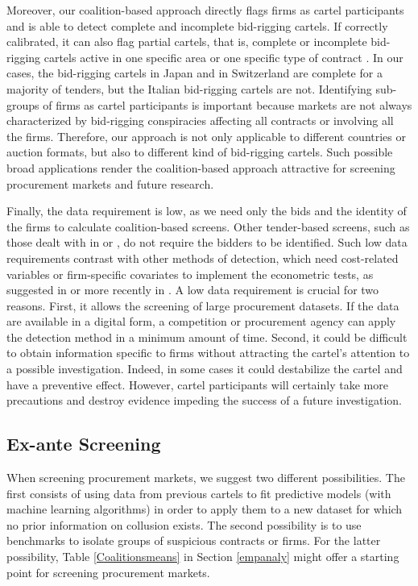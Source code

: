 \documentclass[a4paper,11pt]{article}
\begin{document}
	Moreover, our coalition-based approach directly flags firms as cartel participants and is able to detect complete and incomplete bid-rigging cartels. If correctly calibrated, it can also flag partial cartels, that is, complete or incomplete bid-rigging cartels active in one specific area or one specific type of contract \citep[see, for example,][]{imhof2018screening,Abrantes2006}. In our cases, the bid-rigging cartels in Japan and in Switzerland are complete for a majority of tenders, but the Italian bid-rigging cartels are not. Identifying sub-groups of firms as cartel participants is important because markets are not always characterized by bid-rigging conspiracies affecting all contracts or involving all the firms. Therefore, our approach is not only applicable to different countries or auction formats, but also to different kind of bid-rigging cartels. Such possible broad applications render the coalition-based approach attractive for screening procurement markets and future research.
	
	Finally, the data requirement is low, as we need only the bids and the identity of the firms to calculate coalition-based screens. Other tender-based screens, such as those dealt with in \cite{huber2019machine} or \cite{wallimann2020machine}, do not require the bidders to be identified. Such low data requirements contrast with other methods of detection, which need cost-related variables or firm-specific covariates to implement the econometric tests, as suggested in \cite{Bajari2003} or more recently in \cite{conley2016detecting}. A low data requirement is crucial for two reasons. First, it allows the screening of large procurement datasets. If the data are available in a digital form, a competition or procurement agency can apply the detection method in a minimum amount of time. Second, it could be difficult to obtain information specific to firms without attracting the cartel’s attention to a possible investigation. Indeed, in some cases it could destabilize the cartel and have a preventive effect. However, cartel participants will certainly take more precautions and destroy evidence impeding the success of a future investigation.
	
	\subsection{Ex-ante Screening}
	
	When screening procurement markets, we suggest two different possibilities. The first consists of using data from previous cartels to fit predictive models (with machine learning algorithms) in order to apply them to a new dataset for which no prior information on collusion exists. The second possibility is to use benchmarks to isolate groups of suspicious contracts or firms. For the latter possibility, Table \ref{Coalitionsmeans} in Section \ref{empanaly} might offer a starting point for screening procurement markets. 
	
\end{document}

